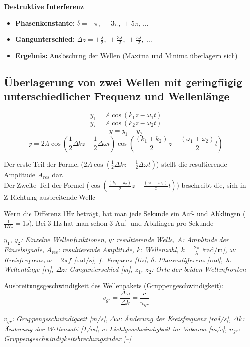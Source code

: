 \documentclass[a4paper,10pt]{article}
\newenvironment{displayformula}
{
	\begin{framed}
		\color{formulaColor}
	}
	{\end{framed}}
\newcommand{\formulalegend}[1]{%
	\par\vspace{0.5ex}%
	{{\color{legendColor}\RaggedRight\small\textit{#1}}}%
	\par\vspace{1.5ex}%
}
\begin{document}
\vspace{1ex}

\textbf{Destruktive Interferenz}

\begin{itemize}
	\item \textbf{Phasenkonstante:} $\delta = \pm \pi,\ \pm 3\pi,\ \pm 5\pi,\ \dots$
	\item \textbf{Gangunterschied:} $\Delta z = \pm \frac{\lambda}{2},\ \pm \frac{3\lambda}{2},\ \pm \frac{5\lambda}{2},\ \dots$
	\item \textbf{Ergebnis:} Auslöschung der Wellen (Maxima und Minima überlagern sich)
\end{itemize}

\subsection{Überlagerung von zwei Wellen mit geringfügig unterschiedlicher Frequenz und Wellenlänge}

\begin{displayformula}
	\[
	y_1 = A \cos (k_1z - \omega_1 t)
	\]
	\[
	y_2 = A \cos (k_2z - \omega_2 t)
	\]
	\[
	y = y_1 + y_2
	\]
	\[
	y = 2 A \cos (\frac{1}{2} \Delta kz - \frac{1}{2} \Delta \omega t) \cos (\frac{(k_1 + k_2)}{2} z - \frac{(\omega_1 + \omega_2)}{2}t)
	\]
\end{displayformula}
Der erste Teil der Formel ($2 A \cos (\frac{1}{2} \Delta kz - \frac{1}{2} \Delta \omega t)$) stellt die resultierende Amplitude $A_{res}$ dar. \\
Der Zweite Teil der Formel ($\cos (\frac{(k_1 + k_2)}{2} z - \frac{(\omega_1 + \omega_2)}{2}t)$) beschreibt die, sich in Z-Richtung ausbreitende Welle

Wenn die Differenz 1Hz beträgt, hat man jede Sekunde ein Auf- und Abklingen ($\frac{1}{1 Hz} = 1s$). Bei 3 Hz hat man schon 3 Auf- und Abklingen pro Sekunde
\formulalegend{
	$y_1$, $y_2$: Einzelne Wellenfunktionen, 
	$y$: resultierende Welle, 
	$A$: Amplitude der Einzelsignale, 
	$A_{\text{res}}$:  resultierende Amplitude, 
	$k$: Wellenzahl, $k = \frac{2\pi}{\lambda}$ [$\text{rad}/\text{m}$], 
	$\omega$: Kreisfrequenz, $\omega = 2\pi f$ [$\text{rad}/\text{s}$], 
	$f$: Frequenz [Hz], 
	$\delta$: Phasendifferenz [rad], 
	$\lambda$: Wellenlänge [m], 
	$\Delta z$: Gangunterschied [m], 
	$z_1$, $z_2$: Orte der beiden Wellenfronten
}

\begin{displayformula}
		Ausbreitungsgeschwindigkeit des Wellenpakets (Gruppengeschwindigkeit):
	\[
	v_{gr} = \frac{\Delta \omega}{\Delta k} = \frac{c}{n_{gr}}
	\]
\end{displayformula}
\formulalegend{
	\( v_{gr} \): Gruppengeschwindigkeit [m/s],
	\( \Delta \omega \): Änderung der Kreisfrequenz [rad/s],
	\( \Delta k \): Änderung der Wellenzahl [1/m],
	\( c \): Lichtgeschwindigkeit im Vakuum [m/s],
	\( n_{gr} \): Gruppengeschwindigkeitsbrechungsindex [–]
}
\end{document}
